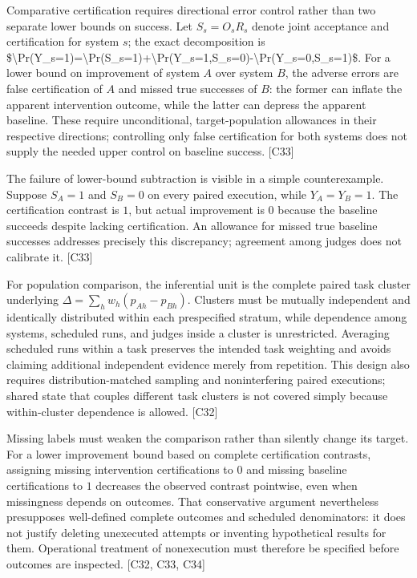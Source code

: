 \documentclass[11pt]{article}
\begin{document}
Comparative certification requires directional error control rather than two separate lower bounds on success. Let $S_s=O_sR_s$ denote joint acceptance and certification for system $s$; the exact decomposition is \$\textbackslash{}Pr(Y\_s=1)=\textbackslash{}Pr(S\_s=1)+\textbackslash{}Pr(Y\_s=1,S\_s=0)-\textbackslash{}Pr(Y\_s=0,S\_s=1)\$. For a lower bound on improvement of system $A$ over system $B$, the adverse errors are false certification of $A$ and missed true successes of $B$: the former can inflate the apparent intervention outcome, while the latter can depress the apparent baseline. These require unconditional, target-population allowances in their respective directions; controlling only false certification for both systems does not supply the needed upper control on baseline success. [C33]

The failure of lower-bound subtraction is visible in a simple counterexample. Suppose $S_A=1$ and $S_B=0$ on every paired execution, while $Y_A=Y_B=1$. The certification contrast is $1$, but actual improvement is $0$ because the baseline succeeds despite lacking certification. An allowance for missed true baseline successes addresses precisely this discrepancy; agreement among judges does not calibrate it. [C33]

For population comparison, the inferential unit is the complete paired task cluster underlying $\Delta=\sum_h w_h(p_{Ah}-p_{Bh})$. Clusters must be mutually independent and identically distributed within each prespecified stratum, while dependence among systems, scheduled runs, and judges inside a cluster is unrestricted. Averaging scheduled runs within a task preserves the intended task weighting and avoids claiming additional independent evidence merely from repetition. This design also requires distribution-matched sampling and noninterfering paired executions; shared state that couples different task clusters is not covered simply because within-cluster dependence is allowed. [C32]

Missing labels must weaken the comparison rather than silently change its target. For a lower improvement bound based on complete certification contrasts, assigning missing intervention certifications to $0$ and missing baseline certifications to $1$ decreases the observed contrast pointwise, even when missingness depends on outcomes. That conservative argument nevertheless presupposes well-defined complete outcomes and scheduled denominators: it does not justify deleting unexecuted attempts or inventing hypothetical results for them. Operational treatment of nonexecution must therefore be specified before outcomes are inspected. [C32, C33, C34]
\end{document}
